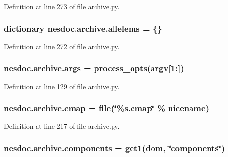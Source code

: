 Definition at line 273 of file archive.\+py.

\subsubsection[{\texorpdfstring{allelems}{allelems}}]{\setlength{\rightskip}{0pt plus 5cm}dictionary nesdoc.\+archive.\+allelems = \{\}}\hypertarget{namespacenesdoc_1_1archive_afc6460f7219d30aa018758b32b884e9c}{}\label{namespacenesdoc_1_1archive_afc6460f7219d30aa018758b32b884e9c}


Definition at line 272 of file archive.\+py.

\subsubsection[{\texorpdfstring{args}{args}}]{\setlength{\rightskip}{0pt plus 5cm}nesdoc.\+archive.\+args = {\bf process\+\_\+opts}(argv\mbox{[}1\+:\mbox{]})}\hypertarget{namespacenesdoc_1_1archive_a5f2a33f88a6a55a1afac59f62b45c81f}{}\label{namespacenesdoc_1_1archive_a5f2a33f88a6a55a1afac59f62b45c81f}


Definition at line 129 of file archive.\+py.

\subsubsection[{\texorpdfstring{cmap}{cmap}}]{\setlength{\rightskip}{0pt plus 5cm}nesdoc.\+archive.\+cmap = file(\char`\"{}\%s.\+cmap\char`\"{} \% nicename)}\hypertarget{namespacenesdoc_1_1archive_aa49c8c4289afd05be16eac14cfa8d146}{}\label{namespacenesdoc_1_1archive_aa49c8c4289afd05be16eac14cfa8d146}


Definition at line 217 of file archive.\+py.

\subsubsection[{\texorpdfstring{components}{components}}]{\setlength{\rightskip}{0pt plus 5cm}nesdoc.\+archive.\+components = {\bf get1}({\bf dom}, \char`\"{}components\char`\"{})}\hypertarget{namespacenesdoc_1_1archive_ae7a2b64dda9dc7c81933106dcb0913e9}{}\label{namespacenesdoc_1_1archive_ae7a2b64dda9dc7c81933106dcb0913e9}


